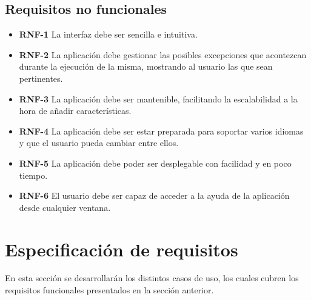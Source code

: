\subsection{Requisitos no funcionales}

\begin{itemize}
	\item \textbf{RNF-1} La interfaz debe ser sencilla e intuitiva.
	\item \textbf{RNF-2} La aplicación debe gestionar las posibles excepciones que acontezcan durante la ejecución de la misma, mostrando al usuario las que sean pertinentes.
	\item \textbf{RNF-3} La aplicación debe ser mantenible, facilitando la escalabilidad a la hora de añadir características.
	\item \textbf{RNF-4} La aplicación debe ser estar preparada para soportar varios idiomas y que el usuario pueda cambiar entre ellos.
	\item \textbf{RNF-5} La aplicación debe poder ser desplegable con facilidad y en poco tiempo.
	\item \textbf{RNF-6} El usuario debe ser capaz de acceder a la ayuda de la aplicación desde cualquier ventana.
	
\end{itemize}

\section{Especificación de requisitos}

En esta sección se desarrollarán los distintos casos de uso, los cuales cubren los requisitos funcionales presentados en la sección anterior.


